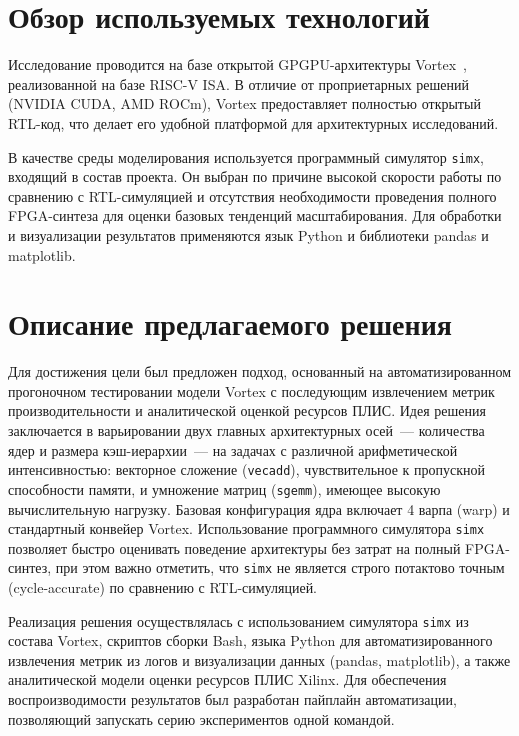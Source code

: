 \documentclass[a4paper]{article}
\begin{document}
\section{Обзор используемых технологий}

Исследование проводится на базе открытой GPGPU-архитектуры Vortex~\cite{vortex_repo}, реализованной на базе RISC-V ISA. В отличие от проприетарных решений (NVIDIA CUDA, AMD ROCm), Vortex предоставляет полностью открытый RTL-код, что делает его удобной платформой для архитектурных исследований.

В качестве среды моделирования используется программный симулятор \texttt{simx}, входящий в состав проекта. Он выбран по причине высокой скорости работы по сравнению с RTL-симуляцией и отсутствия необходимости проведения полного FPGA-синтеза для оценки базовых тенденций масштабирования. Для обработки и визуализации результатов применяются язык Python и библиотеки pandas и matplotlib.

\section{Описание предлагаемого решения}

Для достижения цели был предложен подход, основанный на автоматизированном прогоночном тестировании модели Vortex с последующим извлечением метрик производительности и аналитической оценкой ресурсов ПЛИС. Идея решения заключается в варьировании двух главных архитектурных осей~--- количества ядер и размера кэш-иерархии~--- на задачах с различной арифметической интенсивностью: векторное сложение (\texttt{vecadd}), чувствительное к пропускной способности памяти, и умножение матриц (\texttt{sgemm}), имеющее высокую вычислительную нагрузку. Базовая конфигурация ядра включает 4 варпа (warp) и стандартный конвейер Vortex. Использование программного симулятора \texttt{simx} позволяет быстро оценивать поведение архитектуры без затрат на полный FPGA-синтез, при этом важно отметить, что \texttt{simx} не является строго потактово точным (cycle-accurate) по сравнению с RTL-симуляцией.

Реализация решения осуществлялась с использованием симулятора \texttt{simx} из состава Vortex, скриптов сборки Bash, языка Python для автоматизированного извлечения метрик из логов и визуализации данных (pandas, matplotlib), а также аналитической модели оценки ресурсов ПЛИС Xilinx. Для обеспечения воспроизводимости результатов был разработан пайплайн автоматизации, позволяющий запускать серию экспериментов одной командой.
\end{document}
